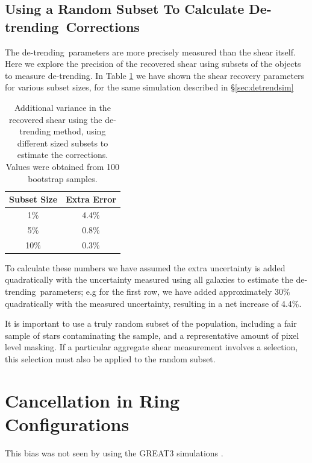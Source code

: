 \documentclass[usegraphicx,usenatbib]{mn2e}
\newcommand{\detrend}{de-trending}
\newcommand{\Detrend}{De-trending}
\begin{document}
\subsection{Using a Random Subset To Calculate \Detrend\ Corrections}

The \detrend\ parameters are more precisely measured than the shear itself.
Here we explore the precision of the recovered shear using subsets of the
objects to measure \detrend.  In Table \ref{tab:subsets} we have shown the
shear recovery parameters for various subset sizes, for the same simulation
described in \S \ref{sec:detrendsim}

\begin{table}
    \centering
    \caption{Additional variance in the recovered shear using the
        de-trending method, using different sized subsets to
        estimate the corrections.  Values were obtained
        from 100 bootstrap samples. \label{tab:subsets}}
    \begin{tabular}{| c | c |}
        Subset Size & Extra Error \\
        \hline
        1\% & 4.4\% \\
        5\% & 0.8\% \\
        10\% & 0.3\% \\
    \end{tabular}
\end{table}


To calculate these numbers we have assumed the extra uncertainty is added
quadratically with the uncertainty measured using all galaxies to estimate the
\detrend\ parameters; e.g for the first row, we have added approximately 30\%
quadratically with the measured uncertainty, resulting in a net increase of
4.4\%.

It is important to use a truly random subset of the population, including a
fair sample of stars contaminating the sample, and a representative amount of
pixel level masking.  If a particular aggregate shear measurement involves a
selection, this selection must also be applied to the random subset.

\section{Cancellation in Ring Configurations}

This bias was not seen by \cite{HuffMcal} using the GREAT3 simulations
\citep{great3}.
\end{document}
